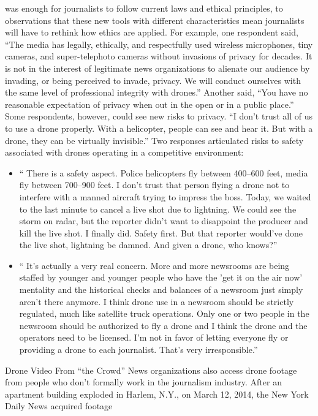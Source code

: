was enough for journalists to follow current laws and ethical principles, to
observations that these new tools with different characteristics mean journalists
will have to rethink how ethics are applied.
For example, one respondent said, ``The media has legally, ethically, and
respectfully used wireless microphones, tiny cameras, and super-telephoto
cameras without invasions of privacy for decades. It is not in the interest of
legitimate news organizations to alienate our audience by invading, or being
perceived to invade, privacy. We will conduct ourselves with the same level
of professional integrity with drones.'' Another said, ``You have no reasonable
expectation of privacy when out in the open or in a public place.'' Some
respondents, however, could see new risks to privacy. ``I don't trust all of us
to use a drone properly. With a helicopter, people can see and hear it. But
with a drone, they can be virtually invisible.''
Two responses articulated risks to safety associated with drones operating
in a competitive environment:
\begin{itemize}
\item `` There is a safety aspect. Police helicopters fly between 400–600
feet, media fly between 700–900 feet. I don't trust that person
flying a drone not to interfere with a manned aircraft trying to
impress the boss. Today, we waited to the last minute to cancel
a live shot due to lightning. We could see the storm on radar,
but the reporter didn't want to disappoint the producer and kill
the live shot. I finally did. Safety first. But that reporter would've
done the live shot, lightning be damned. And given a drone,
who knows?''
\item `` It's actually a very real concern. More and more newsrooms are
being staffed by younger and younger people who have the 'get
it on the air now' mentality and the historical checks and balances
of a newsroom just simply aren't there anymore. I think
drone use in a newsroom should be strictly regulated, much
like satellite truck operations. Only one or two people in the
newsroom should be authorized to fly a drone and I think the
drone and the operators need to be licensed. I'm not in favor of
letting everyone fly or providing a drone to each journalist.
That's very irresponsible.''
\end{itemize}
Drone Video From ``the Crowd''
News organizations also access drone footage from people who don't formally
work in the journalism industry. After an apartment building exploded
in Harlem, N.Y., on March 12, 2014, the New York Daily News acquired footage
